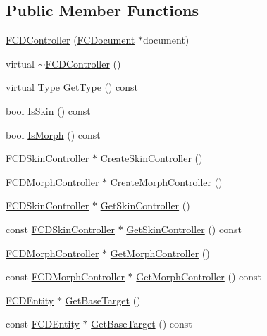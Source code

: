 \subsection*{Public Member Functions}
\begin{DoxyCompactItemize}
\item 
\hyperlink{classFCDController_a04573a2e038e54333ee86fcb3c18540c}{FCDController} (\hyperlink{classFCDocument}{FCDocument} $\ast$document)
\item 
virtual \hyperlink{classFCDController_ae02107dec9fb6fd1d30abcbb3abba043}{$\sim$FCDController} ()
\item 
virtual \hyperlink{classFCDEntity_a9301a4bd5f4d4190ec13e40db4effdd7}{Type} \hyperlink{classFCDController_a2ff5b14d564dba7be26d3b8544bec93c}{GetType} () const 
\item 
bool \hyperlink{classFCDController_a66949037b8bd19c1bbf2f0b0e2b1fefd}{IsSkin} () const 
\item 
bool \hyperlink{classFCDController_ad2894a5bb013f7ee7c21565b1fd0b7fe}{IsMorph} () const 
\item 
\hyperlink{classFCDSkinController}{FCDSkinController} $\ast$ \hyperlink{classFCDController_a808ec0e465cf611a6eb934f0abf51994}{CreateSkinController} ()
\item 
\hyperlink{classFCDMorphController}{FCDMorphController} $\ast$ \hyperlink{classFCDController_a7c96f2438b2cd4e69385c9c7d0172371}{CreateMorphController} ()
\item 
\hyperlink{classFCDSkinController}{FCDSkinController} $\ast$ \hyperlink{classFCDController_a4088c1f8c04cd88fcafa1a82b2c9d587}{GetSkinController} ()
\item 
const \hyperlink{classFCDSkinController}{FCDSkinController} $\ast$ \hyperlink{classFCDController_ae53ae0573ac7e17cfa4718284f4ad7a7}{GetSkinController} () const 
\item 
\hyperlink{classFCDMorphController}{FCDMorphController} $\ast$ \hyperlink{classFCDController_a6a7af0fbd38bb56cf3603e8674e4f445}{GetMorphController} ()
\item 
const \hyperlink{classFCDMorphController}{FCDMorphController} $\ast$ \hyperlink{classFCDController_a500f804426894dd04dcfd30657765305}{GetMorphController} () const 
\item 
\hyperlink{classFCDEntity}{FCDEntity} $\ast$ \hyperlink{classFCDController_a28ef9128280dc48afe55f0398a6c7eb1}{GetBaseTarget} ()
\item 
const \hyperlink{classFCDEntity}{FCDEntity} $\ast$ \hyperlink{classFCDController_ae4035016b183c3aa6fd414571c98b664}{GetBaseTarget} () const 

\end{DoxyCompactItemize}
